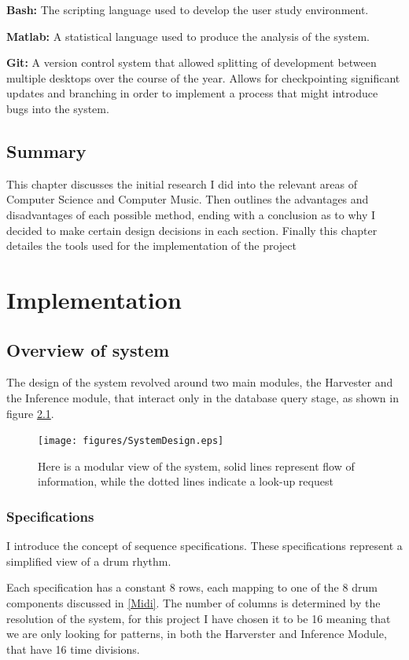 \documentclass[12pt,twoside,notitlepage]{report}
\begin{document}
		\textbf{Bash:} The scripting language used to develop the user study environment.
		
		\textbf{Matlab:} A statistical language used to produce the analysis of the system.
		
		\textbf{Git:} A version control system that allowed splitting of development between multiple desktops over the course of the year. Allows for checkpointing significant updates and branching in order to implement a process that might introduce bugs into the system.
	\section{Summary}
	This chapter discusses the initial research I did into the relevant areas of Computer Science and Computer Music. Then outlines the advantages and disadvantages of each possible method, ending with a conclusion as to why I decided to make certain design decisions in each section. Finally this chapter detailes the tools used for the implementation of the project
\cleardoublepage
\chapter{Implementation}
	\section{Overview of system}	
	
	The design of the system revolved around two main modules, the Harvester and the Inference module, that interact only in the database query stage, as shown in figure \ref{SystemDesign}. 
	
	\begin{figure}[h]
			\centerline{\texttt{[image: figures/SystemDesign.eps]}}
			\caption{\label{SystemDesign} Here is a modular view of the system, solid lines represent flow of information, while the dotted lines indicate a look-up request}
\end{figure}

\subsection{Specifications}\label{Sequence Specifications}

				I introduce the concept of sequence specifications. These specifications represent a simplified view of a drum rhythm.
				
				Each specification has a constant 8 rows, each mapping to one of the 8 drum components discussed in \ref{Midi}. The number of columns is determined by the resolution of the system, for this project I have chosen it to be 16 meaning that we are only looking for patterns, in both the Harverster and Inference Module, that have 16 time divisions.
				
\end{document}
